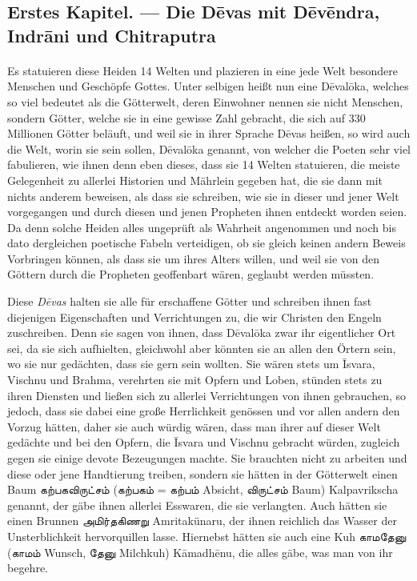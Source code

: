 \documentclass{article}
\newcommand{\TamilText}[1]{\texttamil{#1}}
\newcommand{\tam}[1]{\TamilText{#1}}
\begin{document}
\subsection{Erstes Kapitel. — Die D\={e}vas mit D\={e}v\={e}ndra, Indr\={a}ni und Chitraputra}
\paragraph{}
Es statuieren diese Heiden 14 Welten und plazieren in eine jede Welt besondere Menschen und Geschöpfe Gottes. Unter selbigen heißt nun eine D\={e}val\={o}ka, welches so viel bedeutet als die Götterwelt, deren Einwohner nennen sie nicht Menschen, sondern Götter, welche sie in eine gewisse Zahl gebracht, die sich auf 330 Millionen Götter beläuft, und weil sie in ihrer Sprache D\={e}vas heißen, so wird auch die Welt, worin sie sein sollen, D\={e}val\={o}ka genannt, von welcher die Poeten sehr viel fabulieren, wie ihnen denn eben dieses, dass sie 14 Welten statuieren, die meiste Gelegenheit zu allerlei Historien und Mährlein gegeben hat, die sie dann mit nichts anderem beweisen, als dass sie schreiben, wie sie in dieser und jener Welt vorgegangen und durch diesen und jenen Propheten ihnen entdeckt worden seien. Da denn solche Heiden alles ungeprüft als Wahrheit angenommen und noch bis dato dergleichen poetische Fabeln verteidigen, ob sie gleich keinen andern Beweis Vorbringen können, als dass sie um ihres Alters willen, und weil sie von den Göttern durch die Propheten geoffenbart wären, geglaubt werden müssten.

Diese \emph{D\={e}vas} halten sie alle für erschaffene Götter und schreiben ihnen fast diejenigen Eigenschaften und Verrichtungen zu, die wir Christen den Engeln zuschreiben. Denn sie sagen von ihnen, dass D\={e}val\={o}ka zwar ihr eigentlicher Ort sei, da sie sich aufhielten, gleichwohl aber könnten sie an allen den Örtern sein, wo sie nur gedächten, dass sie gern sein wollten. Sie wären stets um \={I}svara, Vischnu und Brahma, verehrten sie mit Opfern und Loben, stünden stets zu ihren Diensten und ließen sich zu allerlei Verrichtungen von ihnen gebrauchen, so jedoch, dass sie dabei eine große Herrlichkeit genössen und vor allen andern den Vorzug hätten, daher sie auch würdig wären, dass man ihrer auf dieser Welt gedächte und bei den Opfern, die \={I}svara und Vischnu gebracht würden, zugleich gegen sie einige devote Bezeugungen machte. Sie brauchten nicht zu arbeiten und diese oder jene Handtierung treiben, sondern sie hätten in der Götterwelt einen Baum \tam{கற்பகவிருட்சம்} (\tam{கற்பகம்} = \tam{கற்பம்} Absicht, \tam{விருட்சம்} Baum) Kalpavrikscha genannt, der gäbe ihnen allerlei Esswaren, die sie verlangten. Auch hätten sie einen Brunnen \tam{அமிர்தகிணறு} Amritakünaru, der ihnen reichlich das Wasser der Unsterblichkeit hervorquillen lasse. Hiernebst hätten sie auch eine Kuh \tam{காமதேனு} (\tam{காமம்} Wunsch, \tam{தேனு} Milchkuh) K\={a}madh\={e}nu, die alles gäbe, was man von ihr begehre.
\end{document}
